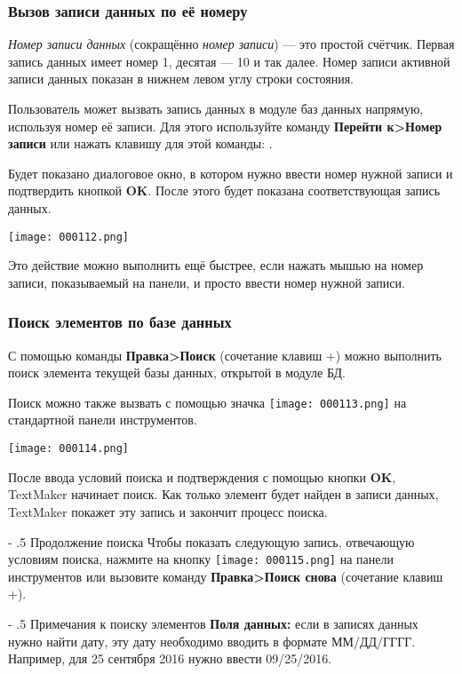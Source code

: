 ﻿\documentclass[a4paper,10pt]{article}
\makeatletter
\renewcommand\paragraph{%
   \@startsection{paragraph}{4}{0mm}%
      {-\baselineskip}%
      {.5\baselineskip}%
      {\normalfont\normalsize\bfseries}}
\makeatother
\begin{document}
\subsubsection{Вызов записи данных по её номеру}
\textit{Номер записи данных} (сокращённо \textit{номер записи}) — это простой счётчик. Первая запись данных имеет номер 1, десятая — 10 и так далее. Номер записи активной записи данных показан в нижнем левом углу строки состояния.

Пользователь может вызвать запись данных в модуле баз данных напрямую, используя номер её записи. Для этого используйте команду \textbf{Перейти к>Номер записи} или нажать клавишу для этой команды: .

Будет показано диалоговое окно, в котором нужно ввести номер нужной записи и подтвердить кнопкой \textbf{OK}. После этого будет показана соответствующая запись данных.

\texttt{[image: 000112.png]}

Это действие можно выполнить ещё быстрее, если нажать мышью на номер записи, показываемый на панели, и просто ввести номер нужной записи.

\subsubsection{Поиск элементов по базе данных}
С помощью команды \textbf{Правка>Поиск} (сочетание клавиш +) можно выполнить поиск элемента текущей базы данных, открытой в модуле БД.

Поиск можно также вызвать с помощью значка \texttt{[image: 000113.png]} на стандартной панели инструментов.

\texttt{[image: 000114.png]}

После ввода условий поиска и подтверждения с помощью кнопки \textbf{OK}, TextMaker начинает поиск. Как только элемент будет найден в записи данных, TextMaker покажет эту запись и закончит процесс поиска.

\paragraph{Продолжение поиска}
Чтобы показать следующую запись, отвечающую условиям поиска, нажмите на кнопку \texttt{[image: 000115.png]} на панели инструментов или вызовите команду \textbf{Правка>Поиск снова} (сочетание клавиш +).

\paragraph{Примечания к поиску элементов}
\textbf{Поля данных:} если в записях данных нужно найти дату, эту дату необходимо вводить в формате ММ/ДД/ГГГГ. Например, для 25 сентября 2016 нужно ввести 09/25/2016.
\end{document}
